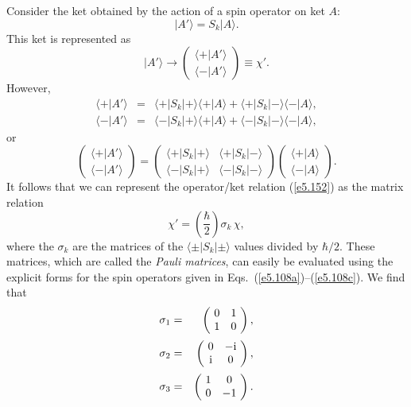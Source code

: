 Consider the ket obtained by the action of a  spin operator on 
ket $A$:
\begin{equation}\label{e5.152}
|A'\rangle = S_k |A\rangle.
\end{equation}
This ket is represented as
\begin{equation}
|A'\rangle 
\rightarrow
\left(\!\begin{array}{c}\langle +|A'\rangle\\
\langle -|A'\rangle\end{array}\!\right)\equiv \chi'.
\end{equation}
However,
\begin{eqnarray}
\langle + |A'\rangle &=& \langle + |S_k| +\rangle \langle +|A\rangle
+ \langle +|S_k |-\rangle \langle -|A\rangle,\\[0.5ex]
\langle - |A'\rangle &=& \langle - |S_k| +\rangle \langle +|A\rangle
+ \langle -|S_k |-\rangle \langle -|A\rangle,
\end{eqnarray}
or
\begin{equation}
\left(\!\begin{array}{c}\langle +|A'\rangle\\[0.5ex]
\langle -|A'\rangle\end{array}\!\right) = 
\left(\!\begin{array}{cc}
\langle + |S_k| +\rangle&\langle +|S_k |-\rangle\\[0.5ex]
\langle - |S_k| +\rangle& \langle -|S_k |-\rangle\end{array}\!\right)
\left(\!\begin{array}{c}\langle +|A\rangle\\[0.5ex]
\langle -|A\rangle\end{array}\!\right).\label{e5.155}
\end{equation}
It follows that we can represent the operator/ket relation
(\ref{e5.152})  as the matrix relation
\begin{equation}
\chi' =\left( \frac{\hbar}{2}\right)\sigma_k \,\chi,
\end{equation}
where the $\sigma_k$ are the matrices of the $\langle \pm |S_k|\pm \rangle$
values divided by $\hbar/2$. These matrices, which are called the
{\em Pauli matrices}, can easily be evaluated using  the explicit forms for the
spin operators given in Eqs.~(\ref{e5.108a})--(\ref{e5.108c}). We find that
\begin{eqnarray}\label{e5.157a}
\sigma_1 &=& \left(\!\begin{array}{cc} 0 &1\\1&0\end{array}\!\right),\\[0.5ex]
\sigma_2 &=& \left(\!\begin{array}{cc} 0 &-{\rm i}\\{\rm i}&0\end{array}\!\right),\\[0.5ex]
\sigma_3 &=& \left(\!\begin{array}{cc} 1 &0\\0&-1\end{array}\!\right).\label{e5.157c}
\end{eqnarray}
